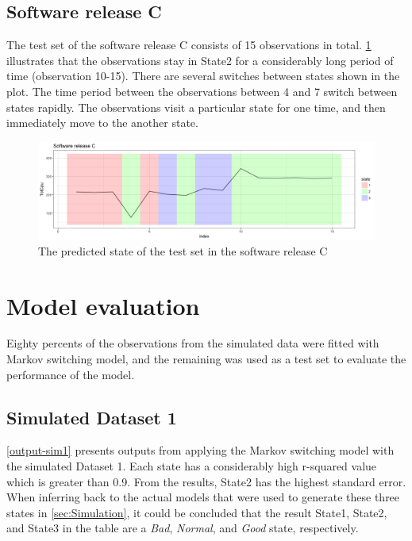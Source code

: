 \subsection{Software release C}

The test set of the software release C consists of 15 observations
in total. \ref{predict_L17A} illustrates that the observations stay
in State2 for a considerably long period of time (observation 10-15).
There are several switches between states shown in the plot. The time
period between the observations between 4 and 7 switch between states
rapidly. The observations visit a particular state for one time, and
then immediately move to the another state. 

\begin{figure}[h]
\begin{centering}
\includegraphics[scale=0.35]{picture/predict_L17A1}
\par\end{centering}
\caption{The predicted state of the test set in the software release C}
\label{predict_L17A}
\end{figure}


\section{Model evaluation \label{sec:Assessing}}

Eighty percents of the observations from the simulated data were fitted
with Markov switching model, and the remaining was used as a test
set to evaluate the performance of the model. 

\subsection{Simulated Dataset 1}

\ref{output-sim1} presents outputs from applying the Markov switching
model with the simulated Dataset 1. Each state has a considerably
high r-squared value which is greater than 0.9. From the results,
State2 has the highest standard error. When inferring back to the
actual models that were used to generate these three states in \ref{sec:Simulation},
it could be concluded that the result State1, State2, and State3 in
the table are a \emph{Bad}, \emph{Normal}, and \emph{Good} state,
respectively.

